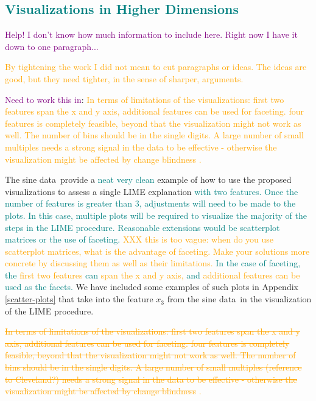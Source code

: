 \documentclass[AMS,STIX2COL]{WileyNJD-v2}\usepackage[]{graphicx}\usepackage[]{color}
\newcommand{\hh}[1]{\textcolor{orange}{#1}}
\newcommand{\kgc}[1]{\textcolor{purple}{#1}}
\newcommand{\kge}[1]{\textcolor{teal}{#1}}
\newcommand{\data}{sine data}
\begin{document}
{\subsection{\kge{Visualizations in Higher Dimensions}} \label{limitations}

\kgc{Help! I don't know how much information to include here. Right now I have it down to one paragraph...}

\hh{By tightening the work I did not mean to cut paragraphs or ideas. The ideas are good, but they need tighter, in the sense of sharper, arguments. }

\kgc{Need to work this in}: \hh{In terms of limitations of the visualizations: first two features span the x and y axis, additional features can be used for faceting. four features is completely feasible, beyond that the visualization might not work as well. The number of bins should be in the single digits. A large number of small multiples \citep{Becker:1996gy} needs a strong signal in the data to be effective - otherwise the visualization might be affected by change blindness \citep{simonsChangeBlindness1997, review19}. }

The \data \ provide a \kge{neat} \kge{very clean} example of how to use the proposed visualizations to assess a single LIME explanation \kge{with two features. Once the number of features is greater than 3, adjustments will need to be made to the plots. In this case, multiple plots will be required to visualize the majority of the steps in the LIME procedure. Reasonable extensions would be scatterplot matrices or the use of faceting. \hh{XXX this is too vague: when do you use scatterplot matrices, what is the advantage of faceting. Make your solutions more concrete by discussing them as well as their limitations. }
In the case of faceting, the} \hh{first two features} \kge{can} \hh{span the x and y axis,} \kge{and} \hh{additional features can be} \kge{used as the facets.} We have included some examples of such plots in Appendix \ref{scatter-plots} that take into the feature $x_3$ from the \data \ in the visualization of the LIME procedure. 

\hh{\sout{In terms of limitations of the visualizations: first two features span the x and y axis, additional features can be used for faceting. four features is completely feasible, beyond that the visualization might not work as well. The number of bins should be in the single digits. A large number of small multiples (reference to Cleveland?) needs a strong signal in the data to be effective - otherwise the visualization might be affected by change blindness} \citet{simons:1997, vanderplas:2020}.}

}
\end{document}
